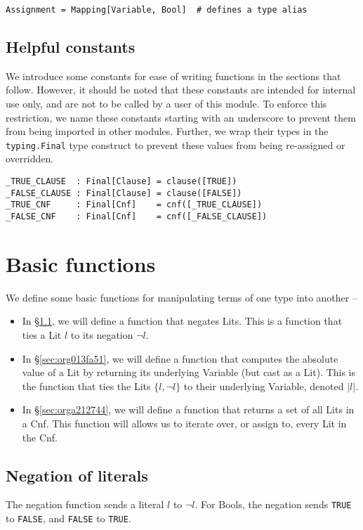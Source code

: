 \documentclass[11pt]{article}
\begin{document}
\begin{verbatim}
Assignment = Mapping[Variable, Bool]  # defines a type alias
\end{verbatim}
\subsection{Helpful constants}
\label{sec:orgfb01940}
We introduce some constants for ease of writing functions in the sections
that follow.  However, it should be noted that these constants are intended
for internal use only, and are not to be called by a user of this
module. To enforce this restriction, we name these constants starting with
an underscore to prevent them from being imported in other
modules. Further, we wrap their types in the \texttt{typing.Final} type construct
to prevent these values from being re-assigned or overridden.

\begin{verbatim}
_TRUE_CLAUSE  : Final[Clause] = clause([TRUE])
_FALSE_CLAUSE : Final[Clause] = clause([FALSE])
_TRUE_CNF     : Final[Cnf]    = cnf([_TRUE_CLAUSE])
_FALSE_CNF    : Final[Cnf]    = cnf([_FALSE_CLAUSE])
\end{verbatim}

\section{Basic functions}
\label{sec:org95949d5}
We define some basic functions for manipulating terms of one type into another --
\begin{itemize}
\item In \S \ref{sec:orga0c0671}, we will define a function that negates
Lits. This is a function that ties a Lit \(l\) to its negation \(\neg
  l\).
\item In \S \ref{sec:org013fa51}, we will define a function that computes
the absolute value of a Lit by returning its underlying Variable (but
cast as a Lit). This is the function that ties the Lits \(\{l, \neg l\}\)
to their underlying Variable, denoted \(|l|\).
\item In \S \ref{sec:orga212744}, we will define a function that returns a set of
all Lits in a Cnf. This function will allows us to iterate over, or
assign to, every Lit in the Cnf.
\end{itemize}

\subsection{Negation of literals}
\label{sec:orga0c0671}
The negation function sends a literal \(l\) to \(\neg l\). For Bools, the
negation sends \texttt{TRUE} to \texttt{FALSE}, and \texttt{FALSE} to \texttt{TRUE}.
\end{document}
